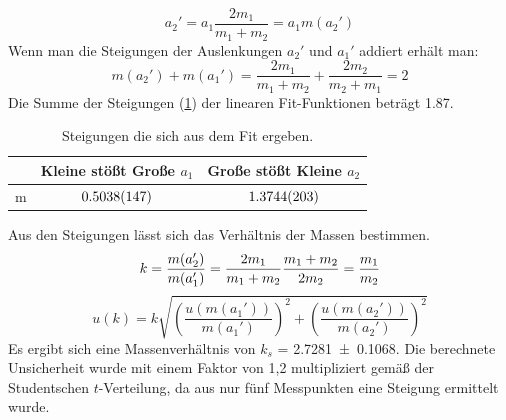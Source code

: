 \documentclass[
	a4paper,
	12pt,
	pagesize,
	ngerman
]{scrartcl}
\begin{document}
	\begin{equation}
		\label{StossGleichung}
		a_2' = a_1 \frac{2m_1}{m_1+m_2} = a_1 m(a_2') %
	\end{equation}
	Wenn man die Steigungen der Auslenkungen $a_2'$ und $a_1'$ addiert erhält man:
	\begin{equation}
		m(a_2') + m(a_1') = \frac{2m_1}{m_1+m_2} + \frac{2m_2}{m_2+m_1} = 2
	\end{equation}
	Die Summe der Steigungen (\cref{TabelleFits}) der linearen Fit-Funktionen beträgt \SI{1,87}{}.
	\begin{table}[tb]
	\centering
	\begin{tabular}{ l | c | c  }
		& Kleine stößt Große $a_1$ & Große stößt Kleine $a_2$ \\ \hline 
		m &  $\SI{0,5038 \pm 0,0147}{}$ &$\SI{1,3744 \pm 0,0203}{}$  \\
	\end{tabular}
	\caption{Steigungen die sich aus dem Fit ergeben.}
	\label{TabelleFits}
	\end{table}
	Aus den Steigungen lässt sich das Verhältnis der Massen bestimmen.
	\begin{equation}
		k = \frac{m(a_2')}{m(a_1')} = \frac{2m_1}{m_1+m_2} \frac{m_1+m_2}{2m_2} = \frac{m_1}{m_2} \\
	\end{equation}
	\begin{equation}
		u(k) =  k \sqrt{\left(\frac{u(m(a_1'))}{m(a_1')}\right)^2 + \left(\frac{u(m(a_2'))}{m(a_2')}\right)^2 }
		\label{UnsicherheitGleichung}
	\end{equation}
	Es ergibt sich eine Massenverhältnis von $k_s$ =  \SI{2,7281 \pm 0,1068}{}. Die berechnete Unsicherheit wurde mit einem Faktor von 1,2 multipliziert gemäß der Studentschen $t$-Verteilung, da aus nur fünf Messpunkten eine Steigung ermittelt wurde.
	
\end{document}
